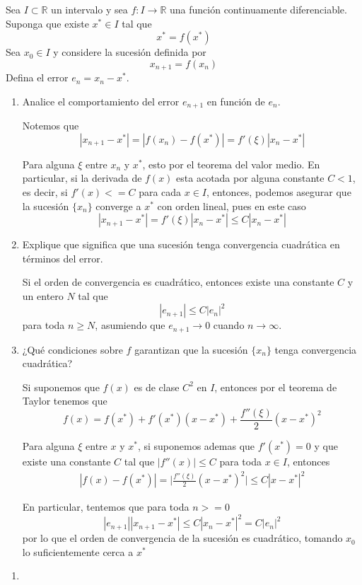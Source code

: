 \documentclass[11pt, oneside]{article}
\begin{document}
\begin{problema}
    Sea \(I\subset\mathbb{R}\) un intervalo y sea $f:I\to\mathbb{R}$ una función continuamente diferenciable. Suponga que existe \(x^*\in I\) tal que \[x^*=f(x^*)\]
    Sea \(x_0\in I\) y considere la sucesión definida por \[x_{n+1}=f(x_n)\]
    Defina el error \(e_n=x_n-x^*\).

    \begin{enumerate}
        \item Analice el comportamiento del error \(e_{n+1}\) en función de \(e_n\).
        
        Notemos que 
        \begin{equation*}
            |x_{n+1}-x^*|=|f(x_n)-f(x^*)|=f'(\xi)|x_n-x^*|
        \end{equation*}

        Para alguna \(\xi\) entre \(x_n\) y \(x^*\), esto por el teorema del valor medio. En particular, si la derivada de \(f(x)\) esta acotada por alguna constante \(C<1\), es decir, si \(f'(x)<=C\) para cada \(x\in I\), entonces, podemos asegurar que la sucesión \(\{x_n\}\) converge a \(x^*\) con orden lineal, pues en este caso
             \begin{equation*}
            |x_{n+1}-x^*|=f'(\xi)|x_n-x^*|\le C|x_n-x^*|
        \end{equation*}
        
        \item Explique que significa que una sucesión tenga convergencia cuadrática
        en términos del error.

        Si el orden de convergencia es cuadrático, entonces existe una constante \(C\) y un entero \(N\) tal que \[|e_{n+1}|\le C|e_n|^2\] para toda \(n\ge N\), asumiendo que \(e_{n+1}\to0\) cuando \(n\to\infty\).

        \item ¿Qué condiciones sobre \(f\) garantizan que la sucesión \(\{x_n\}\) tenga convergencia cuadrática? 
        
        Si suponemos que $f(x)$ es de clase \(C^2\) en \(I\), entonces por el teorema de Taylor tenemos que 
        \[f(x)=f(x^*)+f'(x^*)(x-x^*)+\frac{f''(\xi)}{2}(x-x^*)^2\]

        Para alguna \(\xi\) entre \(x\) y \(x^*\), si suponemos ademas que \(f'(x^*)=0\) y que existe una constante \(C\) tal que \(|f''(x)|\le C\) para toda \(x\in I\), entonces
        \begin{align}
            |f(x)-f(x^*)|=\biggl|\frac{f''(\xi)}{2}(x-x^*)^2\biggr|\le C|x-x^*|^2
        \end{align}
        
        En particular, tentemos que para toda \(n>=0\) \[|e_{n+1}||x_{n+1}-x^*|\le C|x_n-x^*|^2=C|e_n|^2\] por lo que el orden de convergencia de la sucesión es cuadrático, tomando $x_0$ lo suficientemente cerca a $x^*$

    \end{enumerate}
    
\end{problema}

\begin{problema}

    \begin{enumerate}
        \item 
    \end{enumerate}
    
\end{problema}
\end{document}
